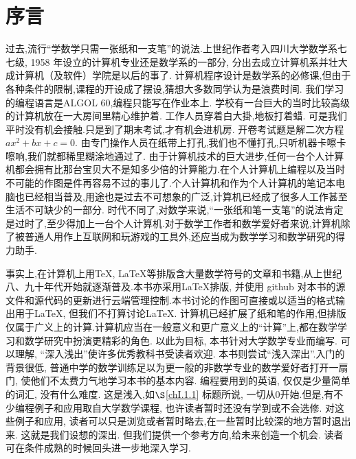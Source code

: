 \chapter*{序\quad 言}

\setcounter{page}{1}
\thispagestyle{empty}

过去,流行“学数学只需一张纸和一支笔”的说法.上世纪作者考入四川大学数学系七七级, 1958 年设立的计算机专业还是数学系的一部分,
分出去成立计算机系并壮大成计算机（及软件）学院是以后的事了.
计算机程序设计是数学系的必修课,但由于各种条件的限制,课程的开设成了摆设,猜想大多数同学认为是浪费时间.
我们学习的编程语言是ALGOL 60,编程只能写在作业本上.
学校有一台巨大的当时比较高级的计算机放在一大房间里精心维护着.
工作人员穿着白大掛,地板打着蜡.
可是我们平时没有机会接触.只是到了期末考试,才有机会进机房.
开卷考试题是解二次方程 $ax^2+bx+c = 0$.
由专门操作人员在纸带上打孔,我们也不懂打孔,只听机器卡嚓卡嚓响,我们就都稀里糊涂地通过了.
由于计算机技术的巨大进步,任何一台个人计算机都会拥有比那台宝贝大不是知多少倍的计算能力.在个人计算机上编程以及当时不可能的作图是件再容易不过的事儿了.个人计算机和作为个人计算机的笔记本电脑也已经相当普及,用途也是过去不可想象的广泛,计算机已经成了很多人工作甚至生活不可缺少的一部分.
时代不同了,对数学来说,“一张纸和笔一支笔”的说法肯定是过时了,至少得加上一台个人计算机.对于数学工作者和数学爱好者来说,计算机除了被普通人用作上互联网和玩游戏的工具外,还应当成为数学学习和数学研究的得力助手.

事实上,在计算机上用\TeX,  \LaTeX 等排版含大量数学符号的文章和书籍,从上世纪八、九十年代开始就逐渐普及.本书亦采用\LaTeX 排版, 并使用 github 对本书的源文件和源代码的更新进行云端管理控制.本书讨论的作图可直接或以适当的格式输出用于\LaTeX, 但我们不打算讨论\LaTeX.
计算机已经扩展了纸和笔的作用,但排版仅属于广义上的计算.计算机应当在一般意义和更广意义上的“计算”上,都在数学学习和数学研究中扮演更精彩的角色.
以此为目标, 本书针对大学数学专业而编写.
可以理解, “深入浅出”使许多优秀教科书受读者欢迎. 
本书则尝试“浅入深出”.入门的背景很低,
普通中学的数学训练足以为更一般的非数学专业的数学爱好者打开一扇门, 使他们不太费力气地学习本书的基本内容. 编程要用到的英语, 仅仅是少量简单的词汇, 没有什么难度.
这是浅入,如$\S$\ref{chI.1.1} 标题所说, 一切从0开始.但是,有不少编程例子和应用取自大学数学课程, 也许读者暂时还没有学到或不会选修. 对这些例子和应用,
读者可以只是浏览或者暂时略去,在一些暂时比较深的地方暂时退出来.
这就是我们设想的深出.
但我们提供一个参考方向,给未来创造一个机会.
读者可在条件成熟的时候回头进一步地深入学习.

